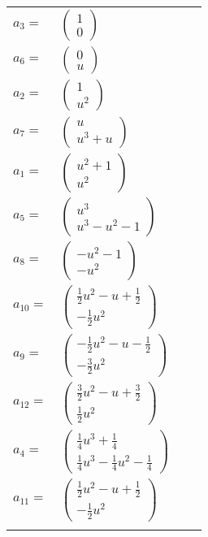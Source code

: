 \documentclass[1p]{elsarticle_modified}
\theoremstyle{definition}
\begin{document}
\begin{tabular}{m{7pt} m{180pt} m{7pt} m{180pt} }
\flushright $a_{3}=$&$\begin{pmatrix}1\\0\end{pmatrix}$ \\
\flushright $a_{6}=$&$\begin{pmatrix}0\\u\end{pmatrix}$ \\
\flushright $a_{2}=$&$\begin{pmatrix}1\\u^2\end{pmatrix}$ \\
\flushright $a_{7}=$&$\begin{pmatrix}u\\u^3+u\end{pmatrix}$ \\
\flushright $a_{1}=$&$\begin{pmatrix}u^2+1\\u^2\end{pmatrix}$ \\
\flushright $a_{5}=$&$\begin{pmatrix}u^3\\u^3- u^2-1\end{pmatrix}$ \\
\flushright $a_{8}=$&$\begin{pmatrix}- u^2-1\\- u^2\end{pmatrix}$ \\
\flushright $a_{10}=$&$\begin{pmatrix}\frac{1}{2} u^2- u+\frac{1}{2}\\-\frac{1}{2} u^2\end{pmatrix}$ \\
\flushright $a_{9}=$&$\begin{pmatrix}-\frac{1}{2} u^2- u-\frac{1}{2}\\-\frac{3}{2} u^2\end{pmatrix}$ \\
\flushright $a_{12}=$&$\begin{pmatrix}\frac{3}{2} u^2- u+\frac{3}{2}\\\frac{1}{2} u^2\end{pmatrix}$ \\
\flushright $a_{4}=$&$\begin{pmatrix}\frac{1}{4} u^3+\frac{1}{4}\\\frac{1}{4} u^3-\frac{1}{4} u^2-\frac{1}{4}\end{pmatrix}$ \\
\flushright $a_{11}=$&$\begin{pmatrix}\frac{1}{2} u^2- u+\frac{1}{2}\\-\frac{1}{2} u^2\end{pmatrix}$\\&\end{tabular}
\end{document}
